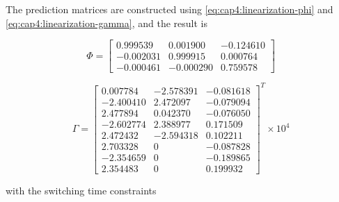 The prediction matrices are constructed using  \eqref{eq:cap4:linearization-phi} and \eqref{eq:cap4:linearization-gamma}, and the result is

\begin{equation}
    \Phi =
    \left[
    \begin{matrix}
       0.999539  &   0.001900 & -0.124610 \\
      -0.002031  &   0.999915 &  0.000764 \\
      -0.000461  &  -0.000290 &  0.759578
    \end{matrix}
    \right]
\end{equation}

\begin{equation}
    \Gamma =
    \left[
    \begin{matrix}
         0.007784  &  -2.578391  &  -0.081618 \\
        -2.400410  &   2.472097  &  -0.079094 \\
         2.477894  &   0.042370  &  -0.076050 \\
        -2.602774  &   2.388977  &   0.171509 \\
         2.472432  &  -2.594318  &   0.102211 \\
         2.703328  &       0     &  -0.087828 \\
        -2.354659  &       0     &  -0.189865 \\
         2.354483  &       0     &   0.199932
    \end{matrix}
    \right]^T
    \times 10^4
\end{equation}

\noindent
with the switching time constraints


